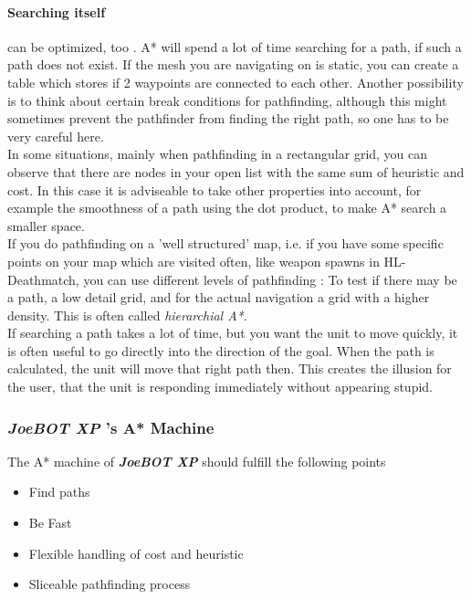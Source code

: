 \documentclass[12pt]{article}
\newcommand {\joebotxp}{\textit{\textbf{JoeBOT XP}} }
\begin{document}
\paragraph{Searching itself} can be optimized, too . A* will spend a lot of time searching for a path, if such a path does not exist. If the mesh you are navigating on is static, you can create a table which stores if 2 waypoints are connected to each other. Another possibility is to think about certain break conditions for pathfinding, although this might sometimes prevent the pathfinder from finding the right path, so one has to be very careful here.\\
In some situations, mainly when pathfinding in a rectangular grid, you can observe that there are nodes in your open list with the same sum of heuristic and cost. In this case it is adviseable to take other properties into account, for example the smoothness of a path using the dot product, to make A* search a smaller space.\\
If you do pathfinding on a 'well structured' map, i.e. if you have some specific points on your map which are visited often, like weapon spawns in HL-Deathmatch, you can use different levels of pathfinding : To test if there may be a path, a low detail grid, and for the actual navigation a grid with a higher density. This is often called \textit{hierarchial A*}.\\
If searching a path takes a lot of time, but you want the unit to move quickly, it is often useful to go directly into the direction of the goal. When the path is calculated, the unit will move that right path then. This creates the illusion for the user, that the unit is responding immediately without appearing stupid.

\subsubsection{\joebotxp's A* Machine}

The A* machine of \joebotxp should fulfill the following points
\begin {itemize}
	\item Find paths
	\item Be Fast
	\item Flexible handling of cost and heuristic
	\item Sliceable pathfinding process
\end {itemize}
\end{document}
